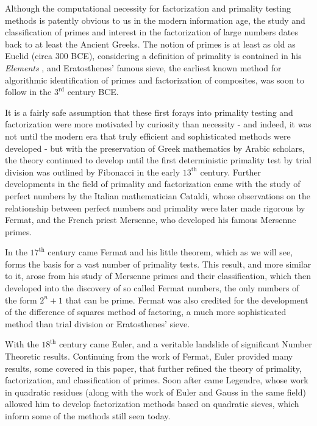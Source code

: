 \documentclass{article}
\begin{document}
\par Although the computational necessity for factorization and primality testing methods is patently obvious to us in the modern 
information age, the study and classification of primes and interest in the factorization of large numbers dates back to at least the Ancient Greeks. The notion of primes is at least as old as Euclid (circa 300 BCE), considering a definition of primality is contained in his \textit{ Elements} \citep{historyref}, and Eratosthenes' famous sieve, the earliest known method for algorithmic identification of primes and factorization of composites, was soon to follow in the $3^{\text{rd}}$ century BCE. 
\par It is a fairly safe assumption that these first forays into primality testing and factorization were more motivated by curiosity than necessity -  and indeed, it was not until the modern era that truly efficient and sophisticated methods were developed - but with the preservation of Greek mathematics by Arabic scholars, the theory continued to develop until the first deterministic primality test by trial division was outlined by Fibonacci in the early $13^{\text{th}}$ century. Further developments in the field of primality and factorization came with the study of perfect numbers by the Italian mathematician Cataldi, whose observations on the relationship between perfect numbers and primality were later made rigorous by Fermat, and the French priest Mersenne, who developed his famous Mersenne primes.
\par In the $17^{\text{th}}$ century came Fermat and his little theorem, which as we will see, forms the basis for a vast number of primality tests. This result, and more similar to it, arose from his study of Mersenne primes and their classification, which then developed into the discovery of so called Fermat numbers, the only numbers of the form $2^n + 1$ that can be prime. Fermat was also credited for the development of the difference of squares method of factoring, a much more sophisticated method than trial division or Eratosthenes' sieve.
\par With the $18^{\text{th}}$ century came Euler, and a veritable landslide of significant Number Theoretic results. Continuing from the work of Fermat, Euler provided many results, some covered in this paper, that further refined the theory of primality, factorization, and classification of primes. Soon after came Legendre, whose work in quadratic residues (along with the work of Euler and Gauss in the same field) allowed him to develop factorization methods based on quadratic sieves, which inform some of the methods still seen today.
\end{document}

